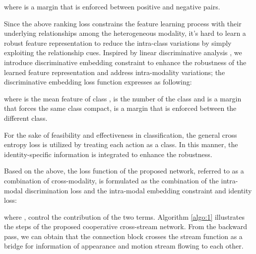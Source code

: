 \documentclass[conference,compsoc]{IEEEtran}
\begin{document}
where  is a margin that is enforced between positive and negative pairs.

Since the above ranking loss constrains the feature learning process with their underlying relationships among the heterogeneous modality, it's hard to learn a robust feature representation to reduce the intra-class variations by simply exploiting the relationship cues. Inspired by linear discriminative analysis \cite{Belhumeur2002Eigenfaces}, we introduce discriminative embedding constraint to enhance the robustness of the learned feature representation and address intra-modality variations; the discriminative embedding loss function expresses as following:
\begin{small}

\end{small}
where  is the mean feature of class ,  is the number of the class and  is a margin that forces the same class compact,  is a margin that is enforced between the different class.

For the sake of feasibility and effectiveness in classification, the general cross entropy loss  is utilized by treating each action as a class. In this manner, the identity-specific information is integrated to enhance the robustness.

Based on the above, the loss function of the proposed network, referred to as a combination of cross-modality, is formulated as the combination of the intra-modal discrimination loss and the intra-modal embedding constraint  and identity loss:

where ,  control the contribution of the two terms. Algorithm \ref{algo:1} illustrates the steps of the proposed cooperative cross-stream network. From the backward pass, we can obtain that the connection block crosses the stream function as a bridge for information of appearance and motion stream flowing to each other.
\end{document}
